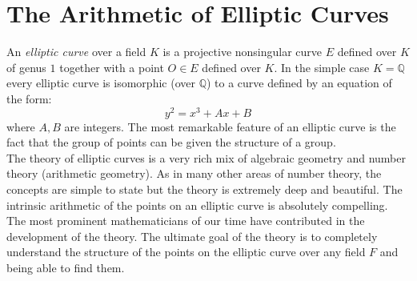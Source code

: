 \documentclass[12pt]{article}
\newcommand{\Rats}{\mathbb{Q}}
\begin{document}
\section*{The Arithmetic of Elliptic Curves}
An {\it elliptic curve} over a field $K$ is a projective nonsingular curve $E$ defined over $K$ of genus $1$ together with a point $O\in E$ defined over $K$. In the simple case $K=\Rats$ every elliptic curve is isomorphic (over $\Rats$) to a curve defined by an equation of the form:
$$y^2=x^3+Ax+B$$
where $A,B$ are integers. The most remarkable feature of an elliptic curve is the fact that the group of points can be given the structure of a group.\\

The theory of elliptic curves is a very rich mix of algebraic geometry and number theory (arithmetic geometry). As in many other areas of number theory, the concepts are simple to state but the theory is extremely deep and beautiful. The intrinsic arithmetic of the points on an elliptic curve is absolutely compelling. The most prominent mathematicians of our time have contributed in the development of the theory. The ultimate goal of the theory is to completely  understand the structure of the points on the elliptic curve over any field $F$ and being able to find them.   

\addtocounter{section}{1}
\end{document}
